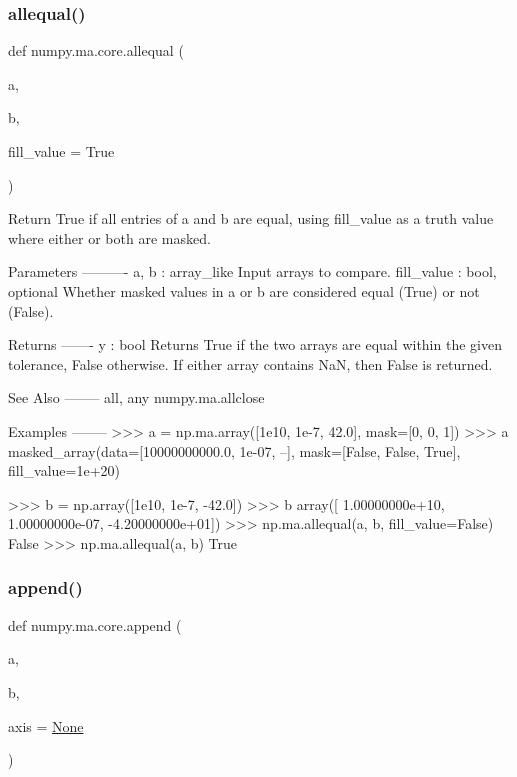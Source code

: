  \mbox{\label{namespacenumpy_1_1ma_1_1core_a168befc64bbacd9c37254d3bbca2bfe9}} 
\subsubsection{\texorpdfstring{allequal()}{allequal()}}
{\footnotesize\ttfamily def numpy.\+ma.\+core.\+allequal (\begin{DoxyParamCaption}\item[{}]{a,  }\item[{}]{b,  }\item[{}]{fill\+\_\+value = {\ttfamily True} }\end{DoxyParamCaption})}

\begin{DoxyVerb}Return True if all entries of a and b are equal, using
fill_value as a truth value where either or both are masked.

Parameters
----------
a, b : array_like
    Input arrays to compare.
fill_value : bool, optional
    Whether masked values in a or b are considered equal (True) or not
    (False).

Returns
-------
y : bool
    Returns True if the two arrays are equal within the given
    tolerance, False otherwise. If either array contains NaN,
    then False is returned.

See Also
--------
all, any
numpy.ma.allclose

Examples
--------
>>> a = np.ma.array([1e10, 1e-7, 42.0], mask=[0, 0, 1])
>>> a
masked_array(data=[10000000000.0, 1e-07, --],
             mask=[False, False,  True],
       fill_value=1e+20)

>>> b = np.array([1e10, 1e-7, -42.0])
>>> b
array([  1.00000000e+10,   1.00000000e-07,  -4.20000000e+01])
>>> np.ma.allequal(a, b, fill_value=False)
False
>>> np.ma.allequal(a, b)
True\end{DoxyVerb}
 \mbox{\label{namespacenumpy_1_1ma_1_1core_a669767dbe91fddc5f602135f776aee64}} 
\subsubsection{\texorpdfstring{append()}{append()}}
{\footnotesize\ttfamily def numpy.\+ma.\+core.\+append (\begin{DoxyParamCaption}\item[{}]{a,  }\item[{}]{b,  }\item[{}]{axis = {\ttfamily \hyperlink{namespacenumpy_1_1ma_1_1core_a647ee1848dfa3692fe35a663a2aa40b3}{None}} }\end{DoxyParamCaption})}

